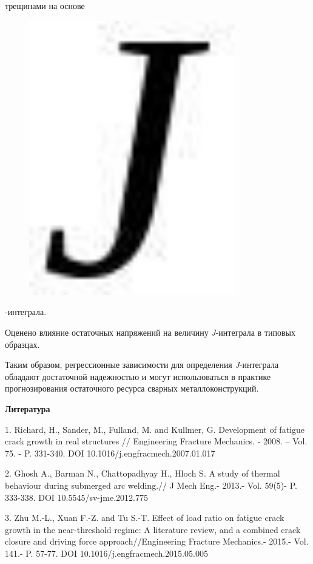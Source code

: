 трещинами на основе \begin{figure}[H]
	\centering
	\includegraphics[width=0.8\textwidth]{assets/1249}
	\caption*{}
\end{figure}-интеграла.

Оценено влияние остаточных напряжений на величину \emph{J}-интеграла в
типовых образцах.

Таким образом, регрессионные зависимости для определения
\emph{J}-интеграла обладают достаточной надежностью и могут
использоваться в практике прогнозирования остаточного ресурса сварных
металлоконструкций.

{\bfseries Литература}

1. Richard, H., Sander, M., Fulland, M. and Kullmer, G. Development of
fatigue crack growth in real structures // Engineering Fracture
Mechanics. - 2008. -- Vol. 75. - P. 331-340. DOI
10.1016/j.engfracmech.2007.01.017

2. Ghosh A., Barman N., Chattopadhyay H., Hloch S. A study of thermal
behaviour during submerged arc welding.// J Mech Eng.- 2013.- Vol.
59(5)- P. 333-338. DOI 10.5545/sv-jme.2012.775

3. Zhu M.-L., Xuan F.-Z. and Tu S.-T. Effect of load ratio on fatigue
crack growth in the near-threshold regime: A literature review, and a
combined crack closure and driving force approach//Engineering Fracture
Mechanics.- 2015.- Vol. 141.- P. 57-77. DOI
10.1016/j.engfracmech.2015.05.005

